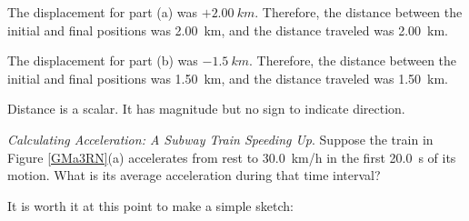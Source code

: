 \documentclass[../../main-ap-physics.tex]{subfiles}
\begin{document}
\vspace{1em}

The displacement for part (a) was $+\SI{2.00}{km}$. Therefore, the distance between the initial and final positions was \SI{2.00}{km}, and the distance traveled was \SI{2.00}{km}.

\vspace{1em}

The displacement for part (b) was $-\SI{1.5}{km}$. Therefore, the distance between the initial and final positions was \SI{1.50}{km}, and the distance traveled was \SI{1.50}{km}.

\vspace{1em}

Distance is a scalar. It has magnitude but no sign to indicate direction.

\endsolution

\begin{example} \label{PLCGFI}
    \textit{Calculating Acceleration: A Subway Train Speeding Up}. Suppose the train in Figure \ref{GMa3RN}(a) accelerates from rest to \SI{30.0}{km/h} in the first \SI{20.0}{s} of its motion. What is its average acceleration during that time interval?
\end{example}

\Solution It is worth it at this point to make a simple sketch:

\begin{center}
\end{center}
\end{document}
